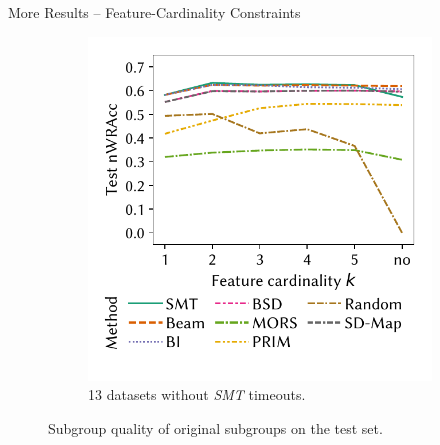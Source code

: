 \documentclass[en, navbaroff]{sdqbeamer}
\begin{document}
\begin{frame}[t]{More Results -- Feature-Cardinality Constraints}
\begin{figure}
\begin{subfigure}[t]{0.35\textwidth}
		\end{subfigure}
		\hspace{\kitcolumnsep}
		\begin{subfigure}[t]{0.35\textwidth}
			\centering
			\includegraphics[width=\textwidth, trim=10 25 10 10, clip]{plots/csd-cardinality-test-nwracc-no-timeout-datasets.pdf}
			\caption{13 datasets without \emph{SMT} timeouts.}
			\label{fig:csd:cardinality-test-nwracc-no-timeout-datasets}
		\end{subfigure}
		\caption*{
			Subgroup quality of original subgroups on the test set.
		}
		\label{fig:csd:cardinality:appendix}
	\end{figure}
\end{frame}
\end{document}

